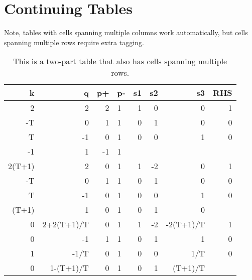 \section{Continuing Tables}
Note, tables with cells spanning multiple columns work automatically, but cells spanning multiple rows require extra tagging.
\begin{table}[ht]
    \caption{This is a two-part table that also has cells spanning multiple rows.}
    \begin{tabular}{rrrlrrrr}
    k      & q          & p+ & p- & s1        & s2         & s3          & RHS       \\ \hline
    2      & 2          & 2  & 1 & 1         & 0          & 0           & 1         \\
    -T     & 0          & 1  & 1 & 0         & 1          & 0           & 0         \\
    T      & -1         & 0  & 1 & 0         & 0          & 1           & 0         \\
    -1     & 1          & -1 & 1 &           &            &             &           \\ \hline
    2(T+1) & 2          & 0  & 1 & 1         & -2         & 0           & 1         \\ \hline
    -T     & 0          & 1  & 1 & 0         & 1          & 0           & 0         \\
    T      & -1         & 0  & 1 & 0         & 0          & 1           & 0         \\
    -(T+1) & 1          & 0  & 1 & 0         & 1          & 0           &           \\ \hline
    0      & 2+2(T+1)/T & 0  & 1 & 1         & -2         & -2(T+1)/T   & 1         \\ \hline
    0      & -1         & 1  & 1 & 0         & 1          & 1           & 0         \\
    1      & -1/T       & 0  & 1 & 0         & 0          & 1/T         & 0         \\
    0      & 1-(T+1)/T  & 0  & 1 & 0         & 1          & (T+1)/T     &           \\ \hline

\end{tabular}
\end{table}

